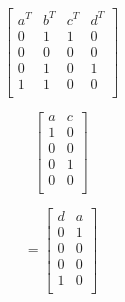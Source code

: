 %
\begin{minipage}{0.18\textwidth}
\begin{center}
\begin{displaymath}
\left[ \begin{array}{cccc}
  a^T & b^T & c^T & d^T \\
  0 & 1 & 1 & 0 \\
  0 & 0 & 0 & 0 \\
  0 & 1 & 0 & 1 \\
  1 & 1 & 0 & 0 \\
\end{array} \right]
\end{displaymath}
\end{center}
\end{minipage}
\hspace{5pt}
\begin{minipage}{0.12\textwidth}
\begin{center}
\begin{displaymath}
\left[ \begin{array}{cc}
   a & c \\
   1 & 0 \\ 
   0 & 0 \\ 
   0 & 1 \\ 
   0 & 0 \\
\end{array} \right]
\end{displaymath}
\end{center}
\end{minipage}
\begin{minipage}{0.12\textwidth}
\begin{center}
\begin{displaymath}
 = \left[ \begin{array}{cc}
  d & a\\
  0 & 1\\
  0 & 0\\ 
  0 & 0\\
  1 & 0\\
\end{array} \right]
\end{displaymath}
\end{center}
\end{minipage}
\\ %

